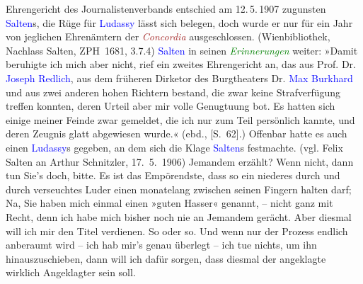 {{{                  Ehrengericht des Journalistenverbands entschied am 12. 5. 1907 zugunsten \textcolor{blue}{Salten}s, die Rüge für \textcolor{blue}{Ludassy} lässt sich belegen, doch wurde er nur für ein Jahr von jeglichen
                  Ehrenämtern der \emph{\textcolor{brown}{Concordia}} ausgeschlossen. (Wienbibliothek, Nachlass Salten, ZPH 1681, 3.7.4)
                     \textcolor{blue}{Salten} in seinen \emph{\textcolor{green}{Erinnerungen}} weiter: »Damit beruhigte ich mich
                     aber nicht, rief ein zweites Ehrengericht an, das aus Prof. Dr. \textcolor{blue}{Joseph Redlich}, aus dem früheren Dirketor
                     des Burgtheaters Dr. \textcolor{blue}{Max Burkhard} und
                     aus zwei anderen hohen Richtern bestand, die zwar keine Strafverfügung treffen
                     konnten, deren Urteil aber mir volle Genugtuung bot. Es hatten sich einige
                     meiner Feinde zwar gemeldet, die ich nur zum Teil persönlich kannte, und deren
                     Zeugnis glatt abgewiesen wurde.« (ebd., [S. 62].) Offenbar
                  hatte es auch einen 
                  { }\textcolor{blue}{Ludassy}s gegeben, an dem sich die Klage \textcolor{blue}{Salten}s festmachte. (vgl. Felix Salten an Arthur Schnitzler, 17. 5. 1906) }}}\label{K_L03415-5h} Jemandem
               erzählt? Wenn nicht, dann tun Sie’s doch, bitte. Es ist das Empörendste, dass so ein
               niederes {\pb}durch und durch
               verseuchtes Luder einen monatelang zwischen seinen Fingern halten darf; Na, Sie haben
               mich einmal einen »guten Hasser« genannt, – nicht ganz mit Recht, denn ich habe mich
               bisher noch nie an Jemandem gerächt. Aber diesmal will ich mir den Titel verdienen.
               So oder so. Und wenn nur der Prozess endlich anberaumt wird – ich hab mir’s genau
               überlegt – ich tue nichts, um ihn hinauszuschieben, dann will ich dafür sorgen, dass
               diesmal der angeklagte wirklich Angeklagter sein soll. \pend
           
